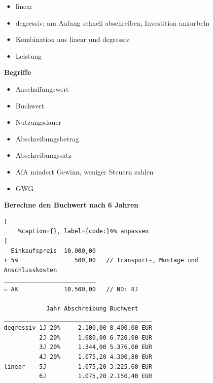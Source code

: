 \begin{itemize}
\item
  linear
\item
  degressiv: am Anfang schnell abschreiben, Investition ankurbeln
\item
  Kombination aus linear und degressiv
\item
  Leistung
\end{itemize}

\textbf{Begriffe}

\begin{itemize}
\item
  Anschaffungswert
\item
  Buchwert
\item
  Nutzungsdauer
\item
  Abschreibungsbetrag
\item
  Abschreibungssatz
\item
  AfA mindert Gewinn, weniger Steuern zahlen
\item
  GWG
\end{itemize}

\textbf{Berechne den Buchwert nach 6 Jahren}

\lstset{language=Python}%
\begin{lstlisting}[
	%caption={}, label={code:}%% anpassen
]
  Einkaufspreis  10.000,00
+ 5%                500,00   // Transport-, Montage und Anschlusskosten
__________________________
= AK             10.500,00   // ND: 8J

            Jahr Abschreibung Buchwert
__________________________________________           
degressiv 1J 20%     2.100,00 8.400,00 EUR
          2J 20%     1.680,00 6.720,00 EUR
          3J 20%     1.344,00 5.376,00 EUR      
          4J 20%     1.075,20 4.300,80 EUR
linear    5J         1.075,20 3.225,60 EUR
          6J         1.075,20 2.150,40 EUR
\end{lstlisting}

\newpage
